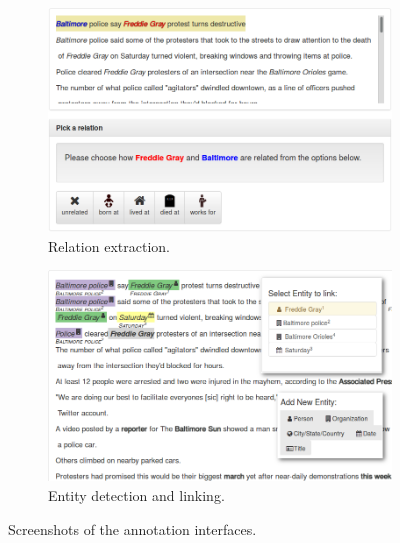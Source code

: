 \begin{figure}[t]
\begin{subfigure}{0.49\textwidth}
  \includegraphics[width=\textwidth]{figures/interface/relation-interface}
  \caption{\label{fig:relation-interface} Relation extraction.}
\end{subfigure}
\hfill
\begin{subfigure}{0.49\textwidth}
  \includegraphics[width=\textwidth]{figures/interface/extraction-interface}
  \caption{\label{fig:entity-interface} Entity detection and linking.}
\end{subfigure}
\caption{\label{fig:interfaces} Screenshots of the annotation interfaces.}
\end{figure}

